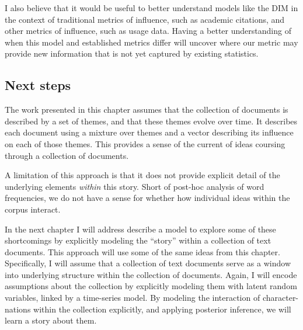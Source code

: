 I also believe that it would be useful to better understand models like
the DIM in the context of traditional metrics of influence, such as
academic citations, and other metrics of influence, such as usage
data.  Having a better understanding of when this model and
established metrics differ will uncover where our metric may provide
new information that is not yet captured by existing statistics.

\subsection{Next steps}
The work presented in this chapter assumes that the collection of
documents is described by a set of themes, and that these themes
evolve over time.  It describes each document using a mixture over
themes and a vector describing its influence on each of those themes.
This provides a sense of the current of ideas coursing through a
collection of documents.

A limitation of this approach is that it does not provide explicit
detail of the underlying elements \emph{within} this story.  Short of
post-hoc analysis of word frequencies, we do not have a sense for
whether how individual ideas within the corpus interact.

In the next chapter I will address describe a model to explore some of
these shortcomings by explicitly modeling the ``story'' within a
collection of text documents.  This approach will use some of the same
ideas from this chapter.  Specifically, I will assume that a
collection of text documents serve as a window into underlying
structure within the collection of documents.  Again, I will encode
assumptions about the collection by explicitly modeling them with
latent random variables, linked by a time-series model.  By modeling
the interaction of character-nations within the collection explicitly,
and applying posterior inference, we will learn a story about them.

